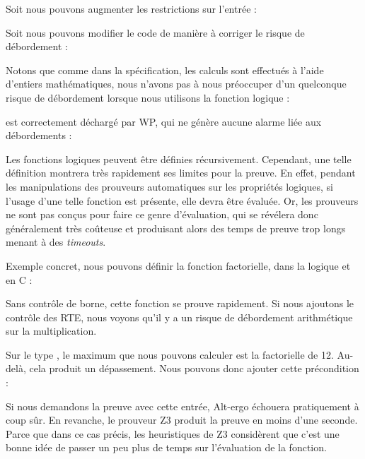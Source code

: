 Soit nous pouvons augmenter les restrictions sur l'entrée :




Soit nous pouvons modifier le code de manière à corriger le risque
de débordement :




Notons que comme dans la spécification, les calculs sont effectués à l'aide
d'entiers mathématiques, nous n'avons pas à nous préoccuper d'un quelconque
risque de débordement lorsque nous utilisons la fonction logique :




est correctement déchargé par WP, qui ne génère aucune alarme liée aux
débordements :






Les fonctions logiques peuvent être définies récursivement. Cependant, une telle
définition montrera très rapidement ses limites pour la preuve. En effet,
pendant les manipulations des prouveurs automatiques sur les propriétés
logiques, si l'usage d'une telle fonction est présente, elle devra être évaluée.
Or, les prouveurs ne sont pas conçus pour faire ce genre d'évaluation, qui se
révélera donc généralement très coûteuse et produisant alors des temps de preuve
trop longs menant à des \textit{timeouts}.



Exemple concret, nous pouvons définir la fonction factorielle, dans la logique
et en C :






Sans contrôle de borne, cette fonction se prouve rapidement. Si nous ajoutons
le contrôle des RTE, nous voyons qu'il y a un risque de débordement
arithmétique sur la multiplication.



Sur le type , le maximum que nous pouvons calculer est la factorielle de
12. Au-delà, cela produit un dépassement. Nous pouvons donc ajouter cette
précondition :






Si nous demandons la preuve avec cette entrée, Alt-ergo échouera pratiquement à
coup sûr. En revanche, le prouveur Z3 produit la preuve en moins d'une seconde.
Parce que dans ce cas précis, les heuristiques de Z3 considèrent que c'est une
bonne idée de passer un peu plus de temps sur l'évaluation de la fonction.



